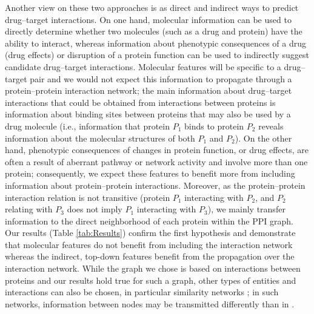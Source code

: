 \documentclass{bioinfo}
\renewcommand{\cite}{\citep}
\begin{document}
Another view on these two approaches is as direct and indirect ways to
predict drug--target interactions. On one hand, molecular information
can be used to directly determine whether two molecules (such as a
drug and protein) have the ability to interact, whereas information
about phenotypic consequences of a drug (drug effects) or disruption
of a protein function can be used to indirectly suggest candidate
drug--target interactions. Molecular features will be specific to a
drug--target pair and we would not expect this information to
propagate through a protein--protein interaction network; the main
information about drug--target interactions that could be obtained
from interactions between proteins is information about binding sites
between proteins that may also be used by a drug molecule (i.e.,
information that protein $P_1$ binds to protein $P_2$ reveals
information about the molecular structures of both $P_1$ and
$P_2$). On the other hand, phenotypic consequences of changes in
protein function, or drug effects, are often a result of aberrant
pathway or network activity and involve more than one protein;
consequently, we expect these features to benefit more from including
information about protein--protein interactions. Moreover, as the
protein--protein interaction relation is not transitive (protein $P_1$
interacting with $P_2$, and $P_2$ relating with $P_3$ does not imply
$P_1$ interacting with $P_3$), we mainly transfer information to the
direct neighborhood of each protein within the PPI graph. Our results
(Table \ref{tab:Results}) confirm the first hypothesis and demonstrate
that molecular features do not benefit from including the interaction
network whereas the indirect, top-down features benefit from the
propagation over the interaction network. While the graph we chose is
based on interactions between proteins and our results hold true for
such a graph, other types of entities and interactions can also be
chosen, in particular similarity networks \cite{Gottlieb2011}; in such
networks, information between nodes may be transmitted differently
than in \name{}.

\end{document}
